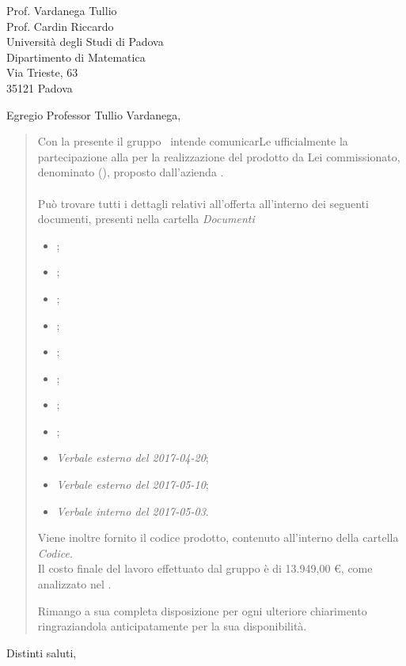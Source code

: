 \documentclass{letter}
\date{Padova, 12 Maggio 2017}
\begin{document}
\begin{letter}{
	Prof. Vardanega Tullio \\
	Prof. Cardin Riccardo \\
	Università degli Studi di Padova \\
	Dipartimento di Matematica \\
	Via Trieste, 63 \\
	35121 Padova
}


\opening{Egregio Professor Tullio Vardanega,}

\begin{quotation}

	Con la presente il gruppo \kpanic\ intende comunicarLe ufficialmente la partecipazione alla \textbf{\revisionediaccettazione} per la realizzazione del prodotto da Lei commissionato, denominato \textbf{\atavi} (\textbf{\acratavi}), proposto dall'azienda \textbf{\prop}.\\\\
	Può trovare tutti i dettagli relativi all'offerta all'interno dei seguenti documenti, presenti nella cartella \textit{Documenti}\vspace{0.5em}

	\begin{itemize}
		\item \analisideirequisitiRA;
		\item {};
		\item \glossarioRA;
		\item \manualesviluppatorev;
		\item \manualeutentev;
		\item \normediprogettoRA;
		\item \pianodiprogettoRA;
		\item \pianodiqualificaRA;
		\item \emph{Verbale esterno del 2017-04-20};
		\item \emph{Verbale esterno del 2017-05-10};		
		\item \emph{Verbale interno del 2017-05-03}.
		\vspace{0.5em}
	\end{itemize}
	Viene inoltre fornito il codice prodotto, contenuto all'interno della cartella \textit{Codice}.\\
	Il costo finale del lavoro effettuato dal gruppo è di 13.949,00 \euro{}, come analizzato nel \pianodiprogettoRA.

	Rimango a sua completa disposizione per ogni ulteriore chiarimento ringraziandola anticipatamente per la sua disponibilità.

\end{quotation}

\closing{Distinti saluti,}

\end{letter}
\end{document}
